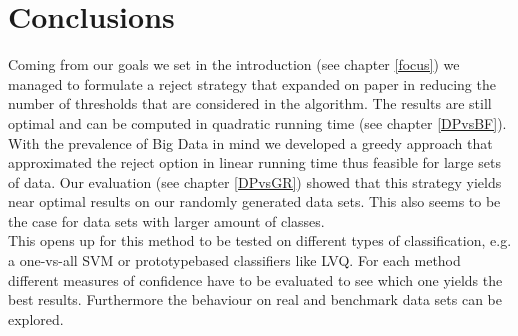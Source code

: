 %
\chapter{Conclusions}
\label{sec:conc}

Coming from our goals we set in the introduction (see chapter \ref{focus}) we managed to formulate a reject strategy that expanded on paper \cite{Fis:2015} in reducing the number of thresholds that are considered in the algorithm. The results are still optimal and can be computed in quadratic running time (see chapter \ref{DPvsBF}). With the prevalence of Big Data in mind we developed a greedy approach that approximated the reject option in linear running time thus feasible for large sets of data. Our evaluation (see chapter \ref{DPvsGR}) showed that this strategy yields near optimal results on our randomly generated data sets. This also seems to be the case for data sets with larger amount of classes. \\

This opens up for this method to be tested on different types of classification, e.g. a one-vs-all SVM or prototypebased classifiers like LVQ. For each method different measures of confidence have to be evaluated to see which one yields the best results. Furthermore the behaviour on real and benchmark data sets can be explored.